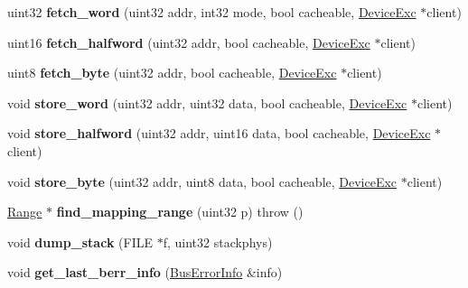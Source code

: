 \begin{DoxyCompactItemize}
\item 
\hypertarget{classMapper_a4633b1f7ac51dfac73feff2fc4cc24e9}{
uint32 {\bfseries fetch\_\-word} (uint32 addr, int32 mode, bool cacheable, \hyperlink{classDeviceExc}{DeviceExc} $\ast$client)}
\label{classMapper_a4633b1f7ac51dfac73feff2fc4cc24e9}

\item 
\hypertarget{classMapper_a89eff1600c368db94fcd2cfecccc3d30}{
uint16 {\bfseries fetch\_\-halfword} (uint32 addr, bool cacheable, \hyperlink{classDeviceExc}{DeviceExc} $\ast$client)}
\label{classMapper_a89eff1600c368db94fcd2cfecccc3d30}

\item 
\hypertarget{classMapper_a8992f22898fce1355d26c9920fc0fd04}{
uint8 {\bfseries fetch\_\-byte} (uint32 addr, bool cacheable, \hyperlink{classDeviceExc}{DeviceExc} $\ast$client)}
\label{classMapper_a8992f22898fce1355d26c9920fc0fd04}

\item 
\hypertarget{classMapper_a7d9aef8d094254baf1a629ce7ac87366}{
void {\bfseries store\_\-word} (uint32 addr, uint32 data, bool cacheable, \hyperlink{classDeviceExc}{DeviceExc} $\ast$client)}
\label{classMapper_a7d9aef8d094254baf1a629ce7ac87366}

\item 
\hypertarget{classMapper_acc43182e1ae60925793b36ba7c35dbfd}{
void {\bfseries store\_\-halfword} (uint32 addr, uint16 data, bool cacheable, \hyperlink{classDeviceExc}{DeviceExc} $\ast$client)}
\label{classMapper_acc43182e1ae60925793b36ba7c35dbfd}

\item 
\hypertarget{classMapper_a161265d93e767b5e52fbfb4d83970f87}{
void {\bfseries store\_\-byte} (uint32 addr, uint8 data, bool cacheable, \hyperlink{classDeviceExc}{DeviceExc} $\ast$client)}
\label{classMapper_a161265d93e767b5e52fbfb4d83970f87}

\item 
\hypertarget{classMapper_af8ef34c52d4c0fdf5f5e7c12587cf455}{
\hyperlink{classRange}{Range} $\ast$ {\bfseries find\_\-mapping\_\-range} (uint32 p)  throw ()}
\label{classMapper_af8ef34c52d4c0fdf5f5e7c12587cf455}

\item 
\hypertarget{classMapper_ab77d2b3eea937495e705aaba009b3940}{
void {\bfseries dump\_\-stack} (FILE $\ast$f, uint32 stackphys)}
\label{classMapper_ab77d2b3eea937495e705aaba009b3940}

\item 
\hypertarget{classMapper_afe775b5a9960a04b565bc851755bb6e4}{
void {\bfseries get\_\-last\_\-berr\_\-info} (\hyperlink{structMapper_1_1BusErrorInfo}{BusErrorInfo} \&info)}
\label{classMapper_afe775b5a9960a04b565bc851755bb6e4}

\end{DoxyCompactItemize}
